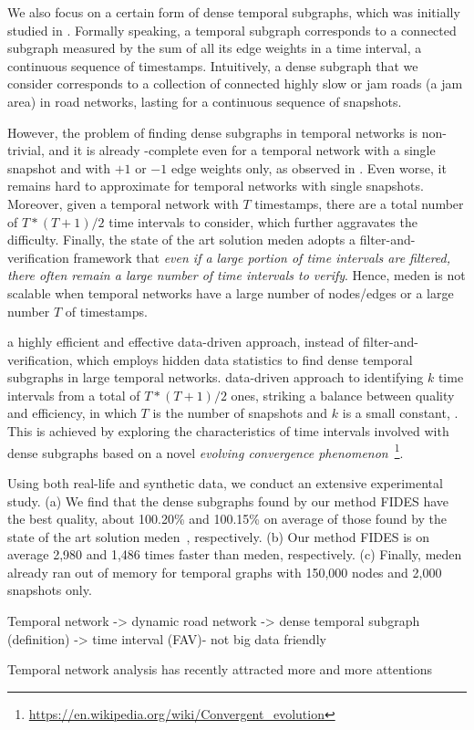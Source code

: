 We also focus on a certain form of dense temporal subgraphs, which was initially studied in \cite{BogdanovMS11}.
Formally speaking, a temporal subgraph corresponds to a connected subgraph measured by the sum of all its edge weights in a time interval, \ie  a continuous sequence of timestamps. Intuitively, a dense subgraph that we consider  corresponds to a  collection of connected highly slow or jam roads (\ie  a jam area) in road networks, lasting for a continuous sequence of snapshots.


However, the problem of  finding dense subgraphs in temporal networks is non-trivial, and it is already \NP-complete even for a temporal network with a single snapshot and with $+1$ or $-1$ edge weights only, as observed in \cite{BogdanovMS11}. Even worse, it remains hard to approximate for temporal networks  with single snapshots. Moreover, given a temporal network with $T$ timestamps, there are a total number of $T*(T+1)/2$ time intervals to consider, which further aggravates the difficulty. Finally, the state of the art solution {\sc meden} \cite{BogdanovMS11} adopts a filter-and-verification framework that {\em even if a large portion of time intervals are filtered, there often remain a large number of time intervals to verify}. Hence, {\sc meden} is not scalable when temporal networks have a large number of nodes/edges or a large number $T$ of timestamps.


 a highly efficient and effective data-driven approach, instead of filter-and-verification, which employs hidden data statistics to find dense temporal subgraphs in large temporal networks.  data-driven approach to identifying $k$ time intervals from a total of $T*(T+1)/2$ ones, striking a balance between quality and efficiency, in which $T$ is the number of snapshots and $k$ is a small constant, . This is achieved by exploring the characteristics of time intervals involved with dense subgraphs based on a novel {\em evolving convergence phenomenon}~\footnote{\small \url{https://en.wikipedia.org/wiki/Convergent_evolution}}.



Using both real-life and synthetic data, we conduct an extensive experimental study.
(a) We find that the dense subgraphs found by our method {\sc FIDES} have the best quality, \ie about 100.20\% and 100.15\% on average of those found by the state of the art solution {\sc meden}~\cite{BogdanovMS11}, respectively.
(b) Our method {\sc FIDES} is  on average 2,980 and 1,486 times  faster than {\sc meden}, respectively.
(c) Finally, {\sc meden} already ran out of memory for temporal graphs with 150,000 nodes and 2,000 snapshots only.


Temporal network -> dynamic road network -> dense temporal subgraph (definition) -> time interval (FAV)- not big data friendly

Temporal network analysis
has recently attracted more and more attentions
